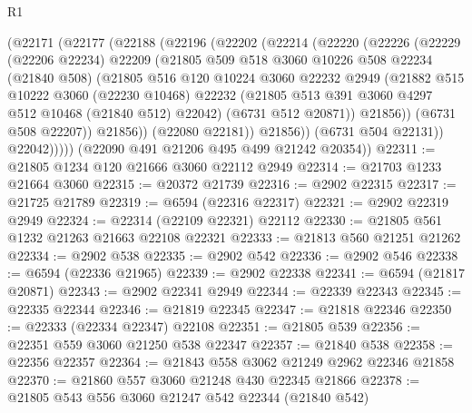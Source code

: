 \begin{lexlean}{R1}
\begin{coremodule}
            (@22171
              (@22177
                (@22188
                  (@22196
                    (@22202
                      (@22214
                        (@22220
                          (@22226
                            (@22229
                              (@22206 @22234)
                              @22209
                              (@21805
                                @509
                                @518
                                @3060
                                @10226
                                @508
                                @22234
                                (@21840 @508)
                                (@21805
                                  @516
                                  @120
                                  @10224
                                  @3060
                                  @22232
                                  @2949
                                  (@21882
                                    @515
                                    @10222
                                    @3060
                                    (@22230 @10468)
                                    @22232
                                    (@21805 @513 @391 @3060 @4297 @512 @10468 (@21840 @512) @22042)
                                    (@6731 @512 @20871))
                                  @21856))
                              (@6731 @508 @22207))
                            @21856))
                        (@22080 @22181))
                      @21856))
                  (@6731 @504 @22131))
                @22042)))))
      (@22090 @491 @21206 @495 @499 @21242 @20354))
@22311 := @21805 @1234 @120 @21666 @3060 @22112 @2949
@22314 := @21703 @1233 @21664 @3060
@22315 := @20372 @21739
@22316 := @2902 @22315
@22317 := @21725 @21789
@22319 := @6594 (@22316 @22317)
@22321 := @2902 @22319 @2949
@22324 := @22314 (@22109 @22321) @22112
@22330 := @21805 @561 @1232 @21263 @21663 @22108 @22321
@22333 := @21813 @560 @21251 @21262
@22334 := @2902 @538
@22335 := @2902 @542
@22336 := @2902 @546
@22338 := @6594 (@22336 @21965)
@22339 := @2902 @22338
@22341 := @6594 (@21817 @20871)
@22343 := @2902 @22341 @2949
@22344 := @22339 @22343
@22345 := @22335 @22344
@22346 := @21819 @22345
@22347 := @21818 @22346
@22350 := @22333 (@22334 @22347) @22108
@22351 := @21805 @539
@22356 := @22351 @559 @3060 @21250 @538 @22347
@22357 := @21840 @538
@22358 := @22356 @22357
@22364 := @21843 @558 @3062 @21249 @2962 @22346 @21858
@22370 := @21860 @557 @3060 @21248 @430 @22345 @21866
@22378 := @21805 @543 @556 @3060 @21247 @542 @22344 (@21840 @542)

\end{coremodule}
\end{lexlean}
